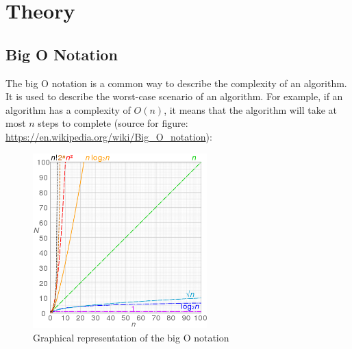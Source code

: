\chapter{Theory} \label{theory}

\section{Big O Notation} \label{theory:big-o}
The big O notation is a common way to describe the complexity of an algorithm.
It is used to describe the worst-case scenario of an algorithm.
For example, if an algorithm has a complexity of $O(n)$, it means that the algorithm will take at most $n$ steps to complete (source for figure: \url{https://en.wikipedia.org/wiki/Big_O_notation}):
\begin{figure}[H]
    \includegraphics[width=0.6\textwidth]{Appendix/480px-Comparison_computational_complexity.png}
    \caption{Graphical representation of the big O notation}
    \label{theory:big-o-graph}
\end{figure}